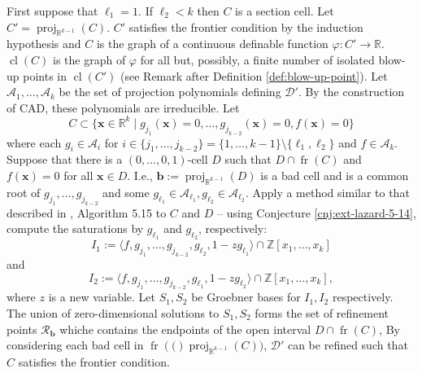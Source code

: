 \documentclass[
]{book}
\theoremstyle{definition}
\theoremstyle{definition}
\theoremstyle{definition}
\theoremstyle{definition}
\theoremstyle{remark}
\begin{document}
First suppose that \(\ell_1 = 1\). If \(\ell_2 < k\) then \(C\) is a section cell.
Let \(C' = {\operatorname{proj}_{\mathbb{R}^{k-1}}}(C)\). \(C'\) satisfies the frontier condition by the induction hypothesis and \(C\) is the graph of a continuous definable function \(\varphi : C' \to \mathbb{R}\).
\({\operatorname{cl} \left( C \right)}\) is the graph of \(\varphi\) for all but, possibly, a finite number of isolated blow-up points in \({\operatorname{cl} \left( C' \right)}\) (see Remark after Definition \ref{def:blow-up-point}).
Let \(\mathcal{A}_1,\ldots,\mathcal{A}_k\) be the set of projection polynomials defining \(\mathcal{D'}\). By the construction of CAD, these polynomials are irreducible. Let
\[
C \subset \{ \mathbf{x} \in \mathbb{R}^k \mid g_{j_1}(\mathbf{x}) = 0, \ldots, g_{j_{k-2}}(\mathbf{x}) = 0, f(\mathbf{x}) = 0 \}
\]
where each \(g_i \in \mathcal{A}_i\) for \(i \in \{j_1,\ldots,j_{k-2}\} = \{1,\ldots,k-1\} \setminus \{{\ell_1}, {\ell_2} \}\) and \(f \in \mathcal{A}_k\).
Suppose that there is a \((0,\ldots,0,1)\)-cell \(D\) such that \(D \cap {\operatorname{fr} \left( C \right)}\) and \(f(\mathbf{x}) = 0\) for all \(\mathbf{x} \in D\). I.e., \(\mathbf{b} := {\operatorname{proj}_{\mathbb{R}^{k-1}}}(D)\) is a bad cell and is a common root of \(g_{j_1}, \ldots, g_{j_{k-2}}\) and some \(g_{\ell_1} \in \mathcal{A}_{\ell_1}, g_{\ell_2} \in \mathcal{A}_{\ell_2}\).
Apply a method similar to that described in \citet{lazard10}, Algorithm 5.15 to \(C\) and \(D\) -- using Conjecture \ref{cnj:ext-lazard-5-14}, compute the saturations by \(g_{\ell_1}\) and \(g_{\ell_2}\), respectively:
\begin{equation}
I_1 := \langle f, g_{j_1}, \ldots, g_{j_{k-2}}, g_{\ell_2}, 1 - z g_{\ell_1} \rangle \cap \mathbb{Z}[x_1,\ldots,x_k]
\label{eq:lazard-n-1}
\end{equation}
and
\begin{equation}
I_2 := \langle f, g_{j_1}, \ldots, g_{j_{k-2}}, g_{\ell_1}, 1 - z g_{\ell_2} \rangle \cap \mathbb{Z}[x_1,\ldots,x_k],
\label{eq:lazard-n-2}
\end{equation}
where \(z\) is a new variable.
Let \(S_1, S_2\) be Groebner bases for \(I_1,I_2\) respectively. The union of zero-dimensional solutions to \(S_1,S_2\) forms the set of refinement points \(\mathcal{R}_\mathbf{b}\) whiche contains the endpoints of the open interval \(D \cap {\operatorname{fr} \left( C \right)}\), By considering each bad cell in \({\operatorname{fr} \left( ( \right)}{\operatorname{proj}_{\mathbb{R}^{k-1}}}(C))\), \(\mathcal{D}'\) can be refined such that \(C\) satisfies the frontier condition.
\end{document}
